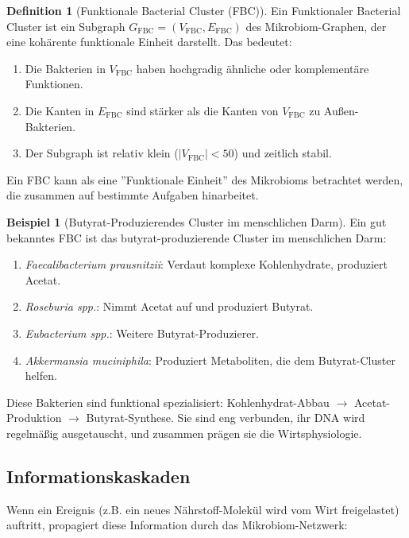 \documentclass[a4paper,12pt]{article}
\theoremstyle{definition}
\newtheorem{definition}{Definition}
\newtheorem{beispiel}{Beispiel}
\begin{document}
\begin{definition}[Funktionale Bacterial Cluster (FBC)]
Ein Funktionaler Bacterial Cluster ist ein Subgraph $G_{\text{FBC}} = (V_{\text{FBC}}, E_{\text{FBC}})$ des Mikrobiom-Graphen, der eine kohärente funktionale Einheit darstellt. Das bedeutet:
\begin{enumerate}
    \item Die Bakterien in $V_{\text{FBC}}$ haben hochgradig ähnliche oder komplementäre Funktionen.
    \item Die Kanten in $E_{\text{FBC}}$ sind stärker als die Kanten von $V_{\text{FBC}}$ zu Außen-Bakterien.
    \item Der Subgraph ist relativ klein ($|V_{\text{FBC}}| < 50$) und zeitlich stabil.
\end{enumerate}

Ein FBC kann als eine ''Funktionale Einheit'' des Mikrobioms betrachtet werden, die zusammen auf bestimmte Aufgaben hinarbeitet.
\end{definition}

\begin{beispiel}[Butyrat-Produzierendes Cluster im menschlichen Darm]
Ein gut bekanntes FBC ist das butyrat-produzierende Cluster im menschlichen Darm:
\begin{enumerate}
    \item \textit{Faecalibacterium prausnitzii}: Verdaut komplexe Kohlenhydrate, produziert Acetat.
    \item \textit{Roseburia spp.}: Nimmt Acetat auf und produziert Butyrat.
    \item \textit{Eubacterium spp.}: Weitere Butyrat-Produzierer.
    \item \textit{Akkermansia muciniphila}: Produziert Metaboliten, die dem Butyrat-Cluster helfen.
\end{enumerate}

Diese Bakterien sind funktional spezialisiert: Kohlenhydrat-Abbau $\to$ Acetat-Produktion $\to$ Butyrat-Synthese. Sie sind eng verbunden, ihr DNA wird regelmäßig ausgetauscht, und zusammen prägen sie die Wirtsphysiologie.
\end{beispiel}

\subsection{Informationskaskaden}

Wenn ein Ereignis (z.B. ein neues Nährstoff-Molekül wird vom Wirt freigelastet) auftritt, propagiert diese Information durch das Mikrobiom-Netzwerk:
\end{document}
